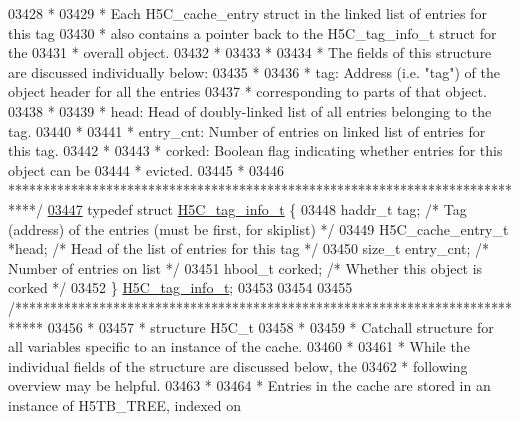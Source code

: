 \begin{DoxyCode}
03428 \textcolor{comment}{ *}
03429 \textcolor{comment}{ * Each H5C\_cache\_entry struct in the linked list of entries for this tag}
03430 \textcolor{comment}{ *      also contains a pointer back to the H5C\_tag\_info\_t struct for the}
03431 \textcolor{comment}{ *      overall object.}
03432 \textcolor{comment}{ *}
03433 \textcolor{comment}{ *}
03434 \textcolor{comment}{ * The fields of this structure are discussed individually below:}
03435 \textcolor{comment}{ *}
03436 \textcolor{comment}{ * tag: Address (i.e. "tag") of the object header for all the entries}
03437 \textcolor{comment}{ *              corresponding to parts of that object.}
03438 \textcolor{comment}{ *}
03439 \textcolor{comment}{ * head: Head of doubly-linked list of all entries belonging to the tag.}
03440 \textcolor{comment}{ *}
03441 \textcolor{comment}{ * entry\_cnt: Number of entries on linked list of entries for this tag.}
03442 \textcolor{comment}{ *}
03443 \textcolor{comment}{ * corked: Boolean flag indicating whether entries for this object can be}
03444 \textcolor{comment}{ *      evicted.}
03445 \textcolor{comment}{ *}
03446 \textcolor{comment}{ ****************************************************************************/}
\hyperlink{struct_h5_c__tag__info__t}{03447} \textcolor{keyword}{typedef} \textcolor{keyword}{struct }\hyperlink{struct_h5_c__tag__info__t}{H5C\_tag\_info\_t} \{
03448     haddr\_t tag;                \textcolor{comment}{/* Tag (address) of the entries (must be first, for skiplist) */}
03449     H5C\_cache\_entry\_t *head;    \textcolor{comment}{/* Head of the list of entries for this tag */}
03450     \textcolor{keywordtype}{size\_t} entry\_cnt;           \textcolor{comment}{/* Number of entries on list */}
03451     hbool\_t corked;             \textcolor{comment}{/* Whether this object is corked */}
03452 \} \hyperlink{struct_h5_c__tag__info__t}{H5C\_tag\_info\_t};
03453 
03454 
03455 \textcolor{comment}{/****************************************************************************}
03456 \textcolor{comment}{ *}
03457 \textcolor{comment}{ * structure H5C\_t}
03458 \textcolor{comment}{ *}
03459 \textcolor{comment}{ * Catchall structure for all variables specific to an instance of the cache.}
03460 \textcolor{comment}{ *}
03461 \textcolor{comment}{ * While the individual fields of the structure are discussed below, the}
03462 \textcolor{comment}{ * following overview may be helpful.}
03463 \textcolor{comment}{ *}
03464 \textcolor{comment}{ * Entries in the cache are stored in an instance of H5TB\_TREE, indexed on}

\end{DoxyCode}
